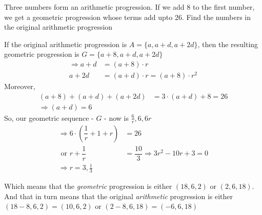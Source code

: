 

\question[5] Three numbers form an arithmetic progression. If we add 8 to the first number,
 we get a geometric progression whose terms add upto 26. Find the numbers in the original 
 arithmetic progression


\ifprintanswers
\fi 

\begin{solution}[\fullpage]
	If the original arithmetic progression is $A = \lbrace a, a + d, a+2d\rbrace$, then the
	resulting geometric progression is $G = \lbrace a + 8, a + d, a + 2d \rbrace$
	\begin{align}
		\Rightarrow a +d &= (a+8)\cdot r \\
		a + 2d &= (a+d)\cdot r = (a + 8)\cdot r^2 
	\end{align}
	Moreover, 
	\begin{align}
		(a+8) + (a+d)+(a+2d) &= 3\cdot(a+d) + 8 = 26 \\
		\Rightarrow (a+d) = 6
	\end{align}
	So, our geometric sequence - $G$ - now is $\frac{6}{r}, 6, 6r$
	\begin{align}
		\Rightarrow 6\cdot\left( \dfrac{1}{r} + 1 + r\right) &= 26 \\
		\text{ or } r + \dfrac{1}{r} &= \dfrac{10}{3} \Rightarrow 3r^2-10r+3 = 0 \\
		\Rightarrow r = 3, \frac{1}{3}
	\end{align}
	
	Which means that the \textit{geometric} progression is either $(18,6,2)$ or $(2,6,18)$.
	And that in turn means that the original \textit{arithmetic} progression is either
	$(18-8,6,2) = (10,6,2)$ or $(2-8,6,18) = (-6,6,18)$
\end{solution}
